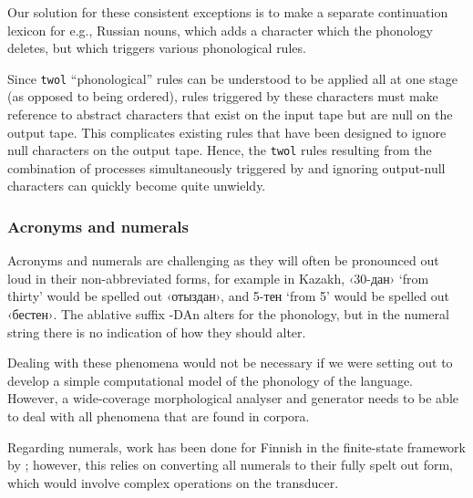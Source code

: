 \documentclass[a4paper,11pt,twocolumn]{article}
\begin{document}
Our solution for these consistent exceptions is to make a separate continuation lexicon for e.g., Russian nouns, which adds a character which the phonology deletes, but which triggers various phonological rules.

Since \texttt{twol} ``phonological'' rules can be understood to be applied all at one stage (as opposed to being ordered), rules triggered by these characters must make reference to abstract characters that exist on the input tape but are null on the output tape.  This complicates existing rules that have been designed to ignore null characters on the output tape.  Hence, the \texttt{twol} rules resulting from the combination of processes simultaneously triggered by and ignoring output-null characters can quickly become quite unwieldy.


\subsubsection{Acronyms and numerals}
Acronyms and numerals are challenging as they will often be pronounced out loud
   in their non-abbreviated forms, for example in Kazakh, ‹30-дан› `from thirty' would be spelled out ‹отыздан›, and 5-тен `from 5' would be spelled out ‹бестен›. The ablative
   suffix -DAn alters for the phonology, but in the numeral string there is no indication of how they should alter.

Dealing with these phenomena would not be necessary if we were setting out to develop a simple computational
model of the phonology of the language. However, a wide-coverage morphological analyser and generator needs to be 
able to deal with all phenomena that are found in corpora.

Regarding numerals, work has been done for Finnish in the finite-state framework by \citep{karttunen06}; however, this relies on converting all numerals to their fully spelt out form, which would involve complex operations 
on the transducer. 
\end{document}
